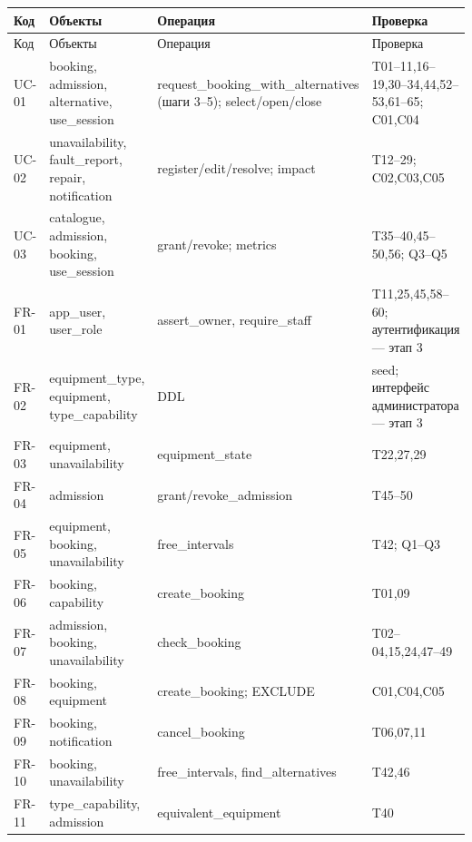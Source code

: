 \begin{singlespace}\small
\begin{longtable}{>{\raggedright\arraybackslash}p{}>{\raggedright\arraybackslash}p{}>{\raggedright\arraybackslash}p{}>{\raggedright\arraybackslash}p{}}
\toprule Код & Объекты & Операция & Проверка\\\midrule\endfirsthead
\toprule Код & Объекты & Операция & Проверка\\\midrule\endhead
UC-01 & booking, admission, alternative, use\_\allowbreak{}session & request\_\allowbreak{}booking\_\allowbreak{}with\_\allowbreak{}alternatives (шаги 3–5); select/\allowbreak{}open/\allowbreak{}close & T01–11,16–19,30–34,44,52–53,61–65; C01,C04 \\
UC-02 & unavailability, fault\_\allowbreak{}report, repair, notification & register/\allowbreak{}edit/\allowbreak{}resolve; impact & T12–29; C02,C03,C05 \\
UC-03 & catalogue, admission, booking, use\_\allowbreak{}session & grant/\allowbreak{}revoke; metrics & T35–40,45–50,56; Q3–Q5 \\
FR-01 & app\_\allowbreak{}user, user\_\allowbreak{}role & assert\_\allowbreak{}owner, require\_\allowbreak{}staff & T11,25,45,58–60; аутентификация — этап 3 \\
FR-02 & equipment\_\allowbreak{}type, equipment, type\_\allowbreak{}capability & DDL & seed; интерфейс администратора — этап 3 \\
FR-03 & equipment, unavailability & equipment\_\allowbreak{}state & T22,27,29 \\
FR-04 & admission & grant/\allowbreak{}revoke\_\allowbreak{}admission & T45–50 \\
FR-05 & equipment, booking, unavailability & free\_\allowbreak{}intervals & T42; Q1–Q3 \\
FR-06 & booking, capability & create\_\allowbreak{}booking & T01,09 \\
FR-07 & admission, booking, unavailability & check\_\allowbreak{}booking & T02–04,15,24,47–49 \\
FR-08 & booking, equipment & create\_\allowbreak{}booking; EXCLUDE & C01,C04,C05 \\
FR-09 & booking, notification & cancel\_\allowbreak{}booking & T06,07,11 \\
FR-10 & booking, unavailability & free\_\allowbreak{}intervals, find\_\allowbreak{}alternatives & T42,46 \\
FR-11 & type\_\allowbreak{}capability, admission & equivalent\_\allowbreak{}equipment & T40 \\

\end{longtable}
\end{singlespace}
